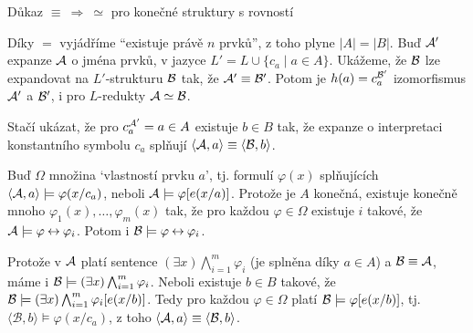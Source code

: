 \documentclass{beamer}
\begin{document}
\begin{frame}{Důkaz $\equiv\ \Rightarrow\ \simeq$ pro konečné struktury s rovností}
    
    \vspace{-6pt}
    Díky $=$ vyjádříme ``existuje právě $n$ prvků'', z toho plyne \alert{$|A|=|B|$}.    
    Buď $\mathcal{A}'$ expanze $\mathcal{A}$ o jména prvků, v jazyce $L'=L\cup\{c_a\mid a\in A\}$. Ukážeme, že $\mathcal{B}$ \alert{lze expandovat} na $L'$-strukturu $\mathcal{B}$ \alert{tak, že $\mathcal{A}'\equiv \mathcal{B}'$}.     
    Potom je \alert{$h(a)= c_a^{\mathcal{B}'}$} izomorfismus $\mathcal{A}'$ a $\mathcal{B}'$, i pro $L$-redukty $\mathcal{A}\simeq\mathcal{B}$.
    
    Stačí ukázat, že \alert{pro $c_a^{\mathcal{A}'}=a\in A$ existuje $b\in B$} tak, že expanze o interpretaci konstantního symbolu $c_a$ splňují \alert{$\langle \mathcal{A},a\rangle\equiv\langle\mathcal{B},b\rangle$}. 
    
    Buď $\Omega$ množina `\alert{vlastností prvku $a$}', tj. formulí $\varphi(x)$ splňujících $\langle \mathcal{A},a\rangle \models \varphi(x/c_a)$, neboli $\mathcal{A}\models \varphi[e(x/a)]$. Protože je $A$ konečná, existuje \alert{konečně mnoho $\varphi_1(x),\dots,\varphi_m(x)$} tak, že pro každou $\varphi \in \Omega$ existuje $i$ takové, že $\mathcal{A}\models \varphi\mathbin{\leftrightarrow}\varphi_i$. Potom i $\mathcal{B}\models\varphi\mathbin{\leftrightarrow}\varphi_i$. %
        
        Protože v $\mathcal{A}$ platí sentence \alert{$(\exists x)\bigwedge_{i=1}^m\varphi_i$} (je splněna díky $a\in A$) a $\mathcal{B}\equiv\mathcal{A}$, máme i $\mathcal{B}\models (\exists x)\bigwedge_{i=1}^m\varphi_i$. Neboli existuje $b\in B$ takové, že $\mathcal{B}\models (\exists x)\bigwedge_{i=1}^m\varphi_i[e(x/b)]$. Tedy pro každou $\varphi\in \Omega$ platí $\mathcal{B}\models \varphi[e(x/b)]$, tj. $\langle\mathcal{B},b\rangle\models \varphi(x/c_a)$, z toho $\langle \mathcal{A},a\rangle\equiv\langle\mathcal{B},b\rangle$.\hfill\qedsymbol

\end{frame}
\end{document}

